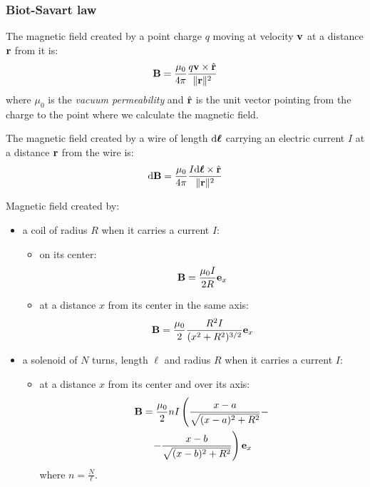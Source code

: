 \documentclass[../../../main.tex]{subfiles}
\begin{document}
\begin{multicols}{2}
  \subsubsection*{Biot-Savart law}
  \begin{prop}
    The magnetic field created by a point charge $q$ moving at velocity $\vb{v}$ at a distance $\vb{r}$ from it is:
    $$\vb{B}=\frac{\mu_0}{4\pi}\frac{q\vb{v}\times\Hat{\vb{r}}}{\|\vb{r}\|^2}$$ where $\mu_0$ is the \textit{vacuum permeability} and $\Hat{\vb{r}}$ is the unit vector pointing from the charge to the point where we calculate the magnetic field.
  \end{prop}
  \begin{law}
    The magnetic field created by a wire of length $\dd\vb*{\ell}$ carrying an electric current $I$ at a distance $\vb{r}$ from the wire is: $$\dd\vb{B}=\frac{\mu_0}{4\pi}\frac{I\dd\vb*{\ell}\times\hat{\vb{r}}}{\|\vb{r}\|^2}$$
  \end{law}
  \begin{prop}
    Magnetic field created by:
    \begin{itemize}
      \item a coil of radius $R$ when it carries a current $I$:
            \begin{itemize}
              \item on its center: $$\vb{B}=\frac{\mu_0I}{2R}\vb{e}_x$$
              \item at a distance $x$ from its center in the same axis: $$\vb{B}=\frac{\mu_0}{2}\frac{R^2I}{(x^2+R^2)^{3/2}}\vb{e}_x$$
            \end{itemize}
      \item a solenoid of $N$ turns, length $\ell$ and radius $R$ when it carries a current $I$:
            \begin{itemize}
              \item at a distance $x$ from its center and over its axis:
                    \begin{multline*} \vb{B}=\frac{\mu_0}{2}nI\left(\frac{x-a}{\sqrt{(x-a)^2+R^2}}-\right.\\\left.-\frac{x-b}{\sqrt{(x-b)^2+R^2}}\right)\vb{e}_x
                    \end{multline*} where $n=\frac{N}{\ell}$.
                    \begin{center}
                      \begin{minipage}{\linewidth}

\end{minipage}
\end{center}
\end{itemize}
\end{itemize}
\end{prop}
\end{multicols}
\end{document}
